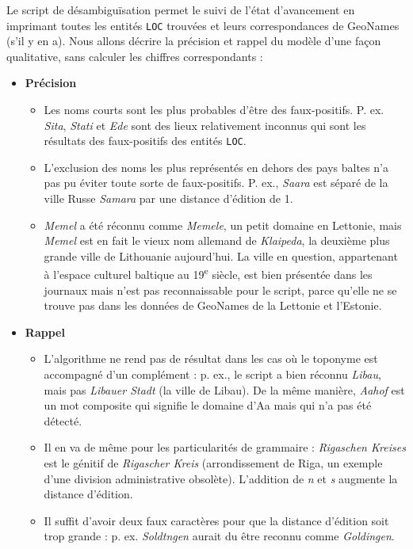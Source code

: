 \documentclass[a4paper,twoside,12pt]{article}
\begin{document}
Le script de désambiguïsation permet le suivi de l'état d'avancement en imprimant toutes les entités \texttt{LOC} trouvées et leurs correspondances de GeoNames (s'il y en a). Nous allons décrire la précision et rappel du modèle d'une façon qualitative, sans calculer les chiffres correspondants :
\vspace{1ex}
\begin{itemize}[label=$\bullet$]
    \item \textbf{Précision}
    \begin{itemize}
        \item Les noms courts sont les plus probables d'être des faux-positifs. P. ex. \textit{Sita}, \textit{Stati} et \textit{Ede} sont des lieux relativement inconnus qui sont les résultats des faux-positifs des entités \texttt{LOC}.
        \item L'exclusion des noms les plus représentés en dehors des pays baltes n'a pas pu éviter toute sorte de faux-positifs. P. ex., \textit{Saara} est séparé de la ville Russe \textit{Samara} par une distance d'édition de 1.
        \item \textit{Memel} a été réconnu comme \textit{Memele}, un petit domaine en Lettonie, mais \textit{Memel} est en fait le vieux nom allemand de \textit{Klaipeda}, la deuxième plus grande ville de Lithouanie aujourd'hui. La ville en question, appartenant à l'espace culturel baltique au 19\textsuperscript{e} siècle, est bien présentée dans les journaux mais n'est pas reconnaissable pour le script, parce qu'elle ne se trouve pas dans les données de GeoNames de la Lettonie et l'Estonie.\\
    \end{itemize}
    \item \textbf{Rappel}
    \begin{itemize}
        \item L'algorithme ne rend pas de résultat dans les cas où le toponyme est accompagné d'un complément : p. ex., le script a bien réconnu \textit{Libau}, mais pas \textit{Libauer Stadt} (la ville de Libau). De la même manière, \textit{Aahof} est un mot composite qui signifie \og le domaine d'Aa \fg{} mais qui n'a pas été détecté.
        \item Il en va de même pour les particularités de grammaire : \textit{Rigaschen Kreises} est le génitif de \textit{Rigascher Kreis} (arrondissement de Riga, un exemple d'une division administrative obsolète). L'addition de \textit{n} et \textit{s} augmente la distance d'édition.
        \item Il suffit d'avoir deux faux caractères pour que la distance d'édition soit trop grande : p. ex. \textit{Soldtngen} aurait du être reconnu comme \textit{Goldingen}.
    \end{itemize}
\end{itemize}
\vspace{1ex}
\end{document}
